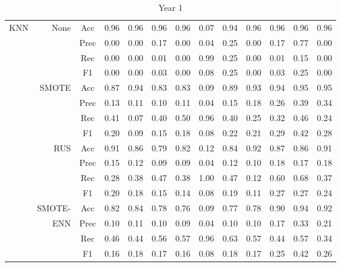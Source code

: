 \begin{table*}
\begin{narrow}{-1cm}{-1cm}
\begin{subtable}[t]{2.05\columnwidth}
\begin{tabular}{l|r|c|cccccccccc}
        KNN & None & Acc & 0.96 & 0.96 & 0.96 & 0.96 & 0.07 & 0.94 & 0.96 & 0.96 & 0.96 & 0.96 \\
        ~ & ~ & Prec & 0.00 & 0.00 & 0.17 & 0.00 & 0.04 & 0.25 & 0.00 & 0.17 & 0.77 & 0.00 \\
        ~ & ~ & Rec & 0.00 & 0.00 & 0.01 & 0.00 & 0.99 & 0.25 & 0.00 & 0.01 & 0.15 & 0.00 \\
        ~ & ~ & F1 & 0.00 & 0.00 & 0.03 & 0.00 & 0.08 & 0.25 & 0.00 & 0.03 & 0.25 & 0.00 \\
        \cline{2-13}
        ~ & SMOTE & Acc & 0.87 & 0.94 & 0.83 & 0.83 & 0.09 & 0.89 & 0.93 & 0.94 & 0.95 & 0.95 \\
        ~ & ~ & Prec & 0.13 & 0.11 & 0.10 & 0.11 & 0.04 & 0.15 & 0.18 & 0.26 & 0.39 & 0.34 \\
        ~ & ~ & Rec & 0.41 & 0.07 & 0.40 & 0.50 & 0.96 & 0.40 & 0.25 & 0.32 & 0.46 & 0.24 \\
        ~ & ~ & F1 & 0.20 & 0.09 & 0.15 & 0.18 & 0.08 & 0.22 & 0.21 & 0.29 & 0.42 & 0.28 \\
        \cline{2-13}
        ~ & RUS & Acc & 0.91 & 0.86 & 0.79 & 0.82 & 0.12 & 0.84 & 0.92 & 0.87 & 0.86 & 0.91 \\
        ~ & ~ & Prec & 0.15 & 0.12 & 0.09 & 0.09 & 0.04 & 0.12 & 0.10 & 0.18 & 0.17 & 0.18 \\
        ~ & ~ & Rec & 0.28 & 0.38 & 0.47 & 0.38 & 1.00 & 0.47 & 0.12 & 0.60 & 0.68 & 0.37 \\
        ~ & ~ & F1 & 0.20 & 0.18 & 0.15 & 0.14 & 0.08 & 0.19 & 0.11 & 0.27 & 0.27 & 0.24 \\
        \cline{2-13}
        ~ & SMOTE- & Acc & 0.82 & 0.84 & 0.78 & 0.76 & 0.09 & 0.77 & 0.78 & 0.90 & 0.94 & 0.92 \\
        ~ & ENN & Prec & 0.10 & 0.11 & 0.10 & 0.09 & 0.04 & 0.10 & 0.10 & 0.17 & 0.33 & 0.21 \\
        ~ & ~ & Rec & 0.46 & 0.44 & 0.56 & 0.57 & 0.96 & 0.63 & 0.57 & 0.44 & 0.57 & 0.34 \\
        ~ & ~ & F1 & 0.16 & 0.18 & 0.17 & 0.16 & 0.08 & 0.18 & 0.17 & 0.25 & 0.42 & 0.26 \\

         \hline \hline
    \end{tabular}
    \caption{\label{tab::results_y1} Year 1}
    
   
\end{subtable}

\end{narrow}
\end{table*} 






